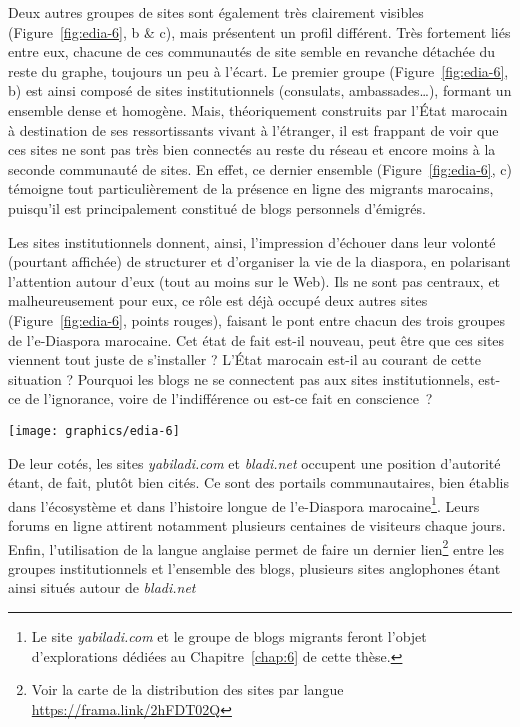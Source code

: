\documentclass[symmetric,justified,marginals=raggedouter]{tufte-book}
\begin{document}
Deux autres groupes de sites sont également très clairement visibles (Figure~\ref{fig:edia-6}, b \& c), mais présentent un profil différent. Très fortement liés entre eux, chacune de ces communautés de site semble en revanche détachée du reste du graphe, toujours un peu à l'écart. Le premier groupe (Figure~\ref{fig:edia-6}, b) est ainsi composé de sites institutionnels (consulats, ambassades\ldots{}), formant un ensemble dense et homogène. Mais, théoriquement construits par l'État marocain à destination de ses ressortissants vivant à l'étranger, il est frappant de voir que ces sites ne sont pas très bien connectés au reste du réseau et encore moins à la seconde communauté de sites. En effet, ce dernier ensemble (Figure~\ref{fig:edia-6}, c) témoigne tout particulièrement de la présence en ligne des migrants marocains, puisqu'il est principalement constitué de blogs personnels d'émigrés. 

Les sites institutionnels donnent, ainsi, l'impression d'échouer dans leur volonté (pourtant affichée) de structurer et d'organiser la vie de la diaspora, en polarisant l'attention autour d'eux (tout au moins sur le Web). Ils ne sont pas centraux, et malheureusement pour eux, ce rôle est déjà occupé deux autres sites (Figure~\ref{fig:edia-6}, points rouges), faisant le pont entre chacun des trois groupes de l'e-Diaspora marocaine. Cet état de fait est-il nouveau, peut être que ces sites viennent tout juste de s'installer ? L'État marocain est-il au courant de cette situation ? Pourquoi les blogs ne se connectent pas aux sites institutionnels, est-ce de l'ignorance, voire de l'indifférence ou est-ce fait en conscience~?    

\begin{figure*}
  \texttt{[image: graphics/edia-6]}
  \caption{Cartographie de l'e-Diaspora marocaine (Par D. Diminescu \& M. Renault)}
  \label{fig:edia-6}
\end{figure*} 


\noindent De leur cotés, les sites \textit{yabiladi.com} et \textit{bladi.net} occupent une position d'autorité étant, de fait, plutôt bien cités. Ce sont des portails communautaires, bien établis dans l'écosystème et dans l'histoire longue de l'e-Diaspora marocaine\footnote{\RaggedOuter Le site \textit{yabiladi.com} et le groupe de blogs migrants feront l'objet d'explorations dédiées au Chapitre~\ref{chap:6} de cette thèse.}. Leurs forums en ligne attirent notamment plusieurs centaines de visiteurs chaque jours. Enfin, l'utilisation de la langue anglaise permet de faire un dernier lien\footnote{\RaggedOuter Voir la carte de la distribution des sites par langue \url{https://frama.link/2hFDT02Q}} entre les groupes institutionnels et l'ensemble des blogs, plusieurs sites anglophones étant ainsi situés autour de \textit{bladi.net}
\end{document}
